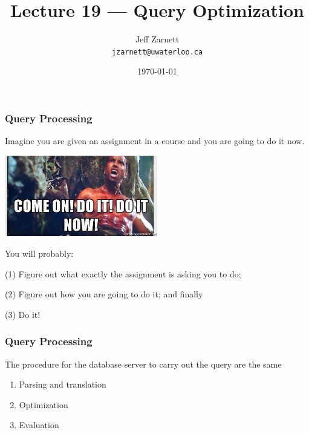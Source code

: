 


\title{Lecture 19 --- Query Optimization}

\author{Jeff Zarnett\\ \small \texttt{jzarnett@uwaterloo.ca}}
\date{\today}




\begin{frame}
  \titlepage

\end{frame}

\begin{frame}
\frametitle{Query Processing}

Imagine you are given an assignment in a course and you are going to do it now. 

\begin{center}
	\includegraphics[width=0.5\textwidth]{images/doitnow.jpg}
\end{center}

You will probably: 

(1) Figure out what exactly the assignment is asking you to do; 

(2) Figure out how you are going to do it; and finally 

(3) Do it! 

\end{frame}


\begin{frame}
\frametitle{Query Processing}

The procedure for the database server to carry out the query are the same

\begin{enumerate}
	\item Parsing and translation
	\item Optimization
	\item Evaluation
\end{enumerate}

\end{frame}


